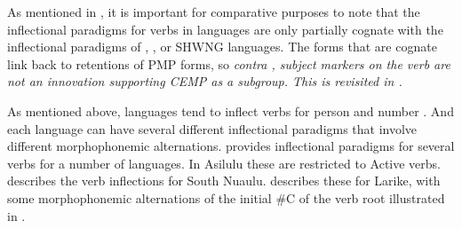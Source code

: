 As mentioned in ,
it is important for comparative purposes to note that the inflectional
paradigms for verbs in  languages are only partially
cognate with the inflectional paradigms of ,
, or SHWNG languages.
The forms that are cognate link back to retentions of PMP forms,
so \it{contra} \citet[258]{Blust1993}, subject markers on the
verb are not an innovation supporting CEMP as a subgroup.
This is revisited in .

As mentioned above,  languages tend to inflect
verbs for person and number \citep[24--26]{Collins1982c,Collins1983}.
And each language can have several different inflectional paradigms
that involve different morphophonemic alternations.
\citet[118--125]{Stresemann1927} provides inflectional paradigms for
several verbs for a number of  languages.
In Asilulu \citep[xxix--xxx]{Collins2003a} these are restricted to Active verbs.
\citet[36--42]{Bolton1990} describes the verb inflections for South Nuaulu.
\citet[86--91]{Laidig1992} describes these for Larike,
with some morphophonemic alternations of the initial {\#}C of
the verb root illustrated in .

